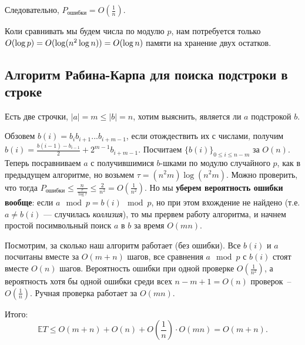 Следовательно, $P_\text{ошибки} = O(\frac{1}{n})$.

Коли сравнивать мы будем числа по модулю $p$, нам потребуется только $O(\log p) = \\ O(\log(n^2\log n)) = O(\log n)$ памяти на хранение двух остатков.

\subsection{Алгоритм Рабина-Карпа для поиска подстроки в строке}

Есть две строчки, $|a|=m\le|b|=n$, хотим выяснить, является ли $a$ подстрокой $b$.

Обзовем $b(i)=b_i b_{i+1}...b_{i+m-1}$, если отождествить их с числами, получим $b(i)=\frac{b(i-1)-b_{i-1}}{2}+2^{m-1} b_{i+m-1}$. Посчитаем $\{b(i)\}_{0\le i\le n-m}$ за $O(n)$. Теперь посравниваем $a$ с получившимися $b$-шками по модулю случайного $p$, как в предыдущем алгоритме, но возьмем $\tau=(n^2m)\log(n^2m)$. Можно проверить, что тогда $P_{\text{ошибки}}\le\frac{n}{\frac{\tau}{\log\tau}}\le\frac{2}{n^2}=O(\frac{1}{n^2})$. Но мы \textbf{уберем вероятность ошибки вообще}: если $a\mod{p}=b(i)\mod{p}$, но при этом вхождение не найдено (т.е. $a\neq b(i)$ --- случилась \emph{коллизия}), то мы прервем работу алгоритма, и начнем простой посимвольный поиск $a$ в $b$ за время $O(mn)$.

Посмотрим, за сколько наш алгоритм работает (без ошибки). Все $b(i)$ и $a$ посчитаны вместе за $O(m+n)$ шагов, все сравнения $a \mod{p}$ с $b(i)$ стоят вместе $O(n)$ шагов. Вероятность ошибки при одной проверке $O(\frac{1}{n^2})$, а вероятность хотя бы одной ошибки среди всех $n-m+1 = O(n)$ проверок~-- $O(\frac{1}{n})$. Ручная проверка работает за $O(mn)$. 

Итого: $$\mathbb E T\le O(m+n) + O(n) + O(\frac{1}{n})\cdot O(mn) = O(m+n).$$